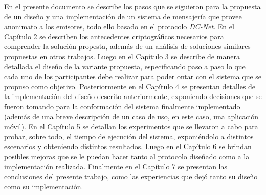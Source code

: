 En el presente documento se describe los pasos que se siguieron para la propuesta de un diseño y una implementación de un sistema de mensajería que 
provee anonimato a los emisores, todo ello basado en el protocolo \emph{DC-Net}. En el Capítulo 2 se describen los antecedentes criptográficos 
necesarios para comprender la solución propesta, además de un análisis de soluciones similares propuestas en otros trabajos. Luego en el Capítulo 3 
se describe de manera detallada el diseño de la variante propuesta, especificando paso a paso lo que cada uno de los participantes debe realizar 
para poder ontar con el sistema que se propuso como objetivo. Posteriormente en el Capítulo 4 se presentan detalles de la implementación del diseño 
descrito anteriormente, exponiendo decisiones que se fueron tomando para la conformación del sistema finalmente implementado (además de una breve 
descripción de un caso de uso, en este caso, una aplicación móvil). En el Capítulo 5 se detallan los experimentos que se llevaron a cabo para probar, 
sobre todo, el tiempo de ejecución del sistema, exponiéndolo a distintos escenarios y obteniendo distintos resultados. Luego en el Capítulo 6 se 
brindan posibles mejoras que se le puedan hacer tanto al protocolo diseñado como a la implementación realizada. Finalmente en el Capítulo 7 se 
presentan las conclusiones del presente trabajo, como las experiencias que dejó tanto su diseño como su implementación.
